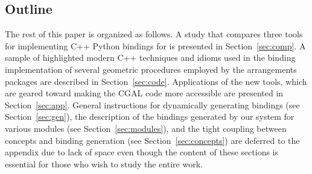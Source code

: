 \subsection{Outline}
\label{ssec:intro:outline}
The rest of this paper is organized as follows. A study that compares three tools for implementing C++ Python bindings for \cgal{} is presented in Section~\ref{sec:comp}. A sample of highlighted modern C++ techniques and idioms used in the binding implementation of several geometric procedures employed by the arrangements packages are described in Section~\ref{sec:code}. Applications of the new tools, which are geared toward making the CGAL code more accessible are presented in
Section~\ref{sec:app}. General instructions for dynamically generating bindings (see Section~\ref{sec:gen}), the description of the bindings generated by our system for various modules (see Section~\ref{sec:modules}), and the tight coupling between concepts and binding generation (see Section~\ref{sec:concepts}) are deferred to the appendix due to lack of space even though the content of these sections is essential for those who wish to study the entire work.

